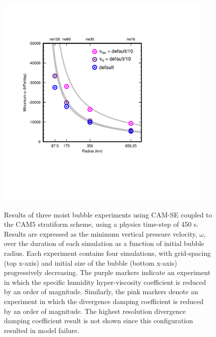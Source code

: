 \begin{figure}
\begin{center}
\noindent\includegraphics[width=25pc,angle=0]{chapter3/SFigure2_crop.pdf}\\
\end{center}
\caption{Results of three moist bubble experiments using CAM-SE coupled to the CAM5 stratiform scheme, using a physics time-step of 450 s. Results are expressed as the minimum vertical pressure velocity, $\omega$, over the duration of each simulation as a function of initial bubble radius. Each experiment contains four simulations, with grid-spacing (top x-axis) and initial size of the bubble (bottom x-axis) progressively decreasing. The purple markers indicate an experiment in which the specific humidity hyper-viscosity coefficient is reduced by an order of magnitude. Similarly, the pink markers denote an experiment in which the divergence damping coefficient is reduced by an order of magnitude. The highest resolution divergence damping coefficient result is not shown since this configuration resulted in model failure.}
\label{fig:sfigure3-2}
\end{figure}
